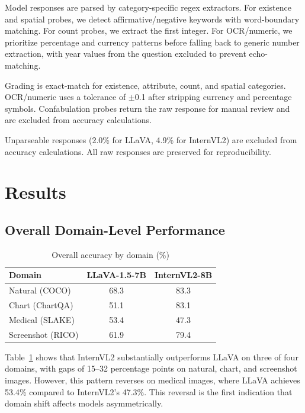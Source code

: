 \documentclass[conference]{IEEEtran}
\begin{document}
Model responses are parsed by category-specific regex extractors. For existence and spatial probes, we detect affirmative/negative keywords with word-boundary matching. For count probes, we extract the first integer. For OCR/numeric, we prioritize percentage and currency patterns before falling back to generic number extraction, with year values from the question excluded to prevent echo-matching.

Grading is exact-match for existence, attribute, count, and spatial categories. OCR/numeric uses a tolerance of $\pm$0.1 after stripping currency and percentage symbols. Confabulation probes return the raw response for manual review and are excluded from accuracy calculations.

Unparseable responses (2.0\% for LLaVA, 4.9\% for InternVL2) are excluded from accuracy calculations. All raw responses are preserved for reproducibility.

\section{Results}

\subsection{Overall Domain-Level Performance}

\begin{table}[t]
\caption{Overall accuracy by domain (\%)}
\label{tab:domain_overall}
\centering
\small
\begin{tabular}{@{}lcc@{}}
\toprule
Domain & LLaVA-1.5-7B & InternVL2-8B \\
\midrule
Natural (COCO) & 68.3 & 83.3 \\
Chart (ChartQA) & 51.1 & 83.1 \\
Medical (SLAKE) & 53.4 & 47.3 \\
Screenshot (RICO) & 61.9 & 79.4 \\
\bottomrule
\end{tabular}
\end{table}

Table~\ref{tab:domain_overall} shows that InternVL2 substantially outperforms LLaVA on three of four domains, with gaps of 15--32 percentage points on natural, chart, and screenshot images. However, this pattern reverses on medical images, where LLaVA achieves 53.4\% compared to InternVL2's 47.3\%. This reversal is the first indication that domain shift affects models asymmetrically.
\end{document}
